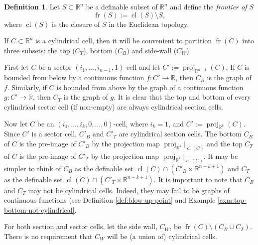 \documentclass[
]{book}
\theoremstyle{definition}
\newtheorem{definition}{Definition}[chapter]
\theoremstyle{definition}
\theoremstyle{definition}
\theoremstyle{definition}
\theoremstyle{remark}
\begin{document}
\begin{definition}
Let \(S \subset \mathbb{R}^n\) be a definable subset of \(\mathbb{R}^n\) and define the \emph{frontier of \(S\)}
\[
{\operatorname{fr} \left( S \right)} := {\operatorname{cl} \left( S \right)} \setminus S,
\]
where \({\operatorname{cl} \left( S \right)}\) is the closure of \(S\) in the Euclidean topology.
\end{definition}

If \(C \subset \mathbb{R}^n\) is a cylindrical cell, then it will be convenient to partition \({\operatorname{fr} \left( C \right)}\) into three subsets: the top (\(C_T\)), bottom (\(C_B\)) and side-wall (\(C_W\)).

First let \(C\) be a sector \((i_1,\ldots,i_{n-1},1)\)-cell and let \(C' := {\operatorname{proj}_{\mathbb{R}^{n-1}}}(C)\). If \(C\) is bounded from below by a continuous function \(f : C' \to \mathbb{R}\), then \(C_B\) is the graph of \(f\). Similarly, if \(C\) is bounded from above by the graph of a continuous function \(g : C' \to \mathbb{R}\), then \(C_T\) is the graph of \(g\). It is clear that the top and bottom of every cylindrical sector cell (if non-empty) are always cylindrical section cells.

Now let \(C\) be an \((i_1,\ldots,i_{k},0,\ldots,0)\)-cell, where \(i_{k}=1\), and \(C' := {\operatorname{proj}_{\mathbb{R}^{k}}}(C)\). Since \(C'\) is a sector cell, \(C'_B\) and \(C'_T\) are cylindrical section cells. The bottom \(C_B\) of \(C\) is the pre-image of \(C'_B\) by the projection map \({\operatorname{proj}_{\mathbb{R}^{k}}}\vert_{{\operatorname{cl} \left( C \right)}}\) and the top \(C_T\) of \(C\) is the pre-image of \(C'_T\) by the projection map \({\operatorname{proj}_{\mathbb{R}^{k}}}\vert_{{\operatorname{cl} \left( C \right)}}\).
It may be simpler to think of \(C_B\) as the definable set \({\operatorname{cl} \left( C \right)} \cap (C'_B \times \mathbb{R}^{n - k + 1})\) and \(C_T\) as the definable set \({\operatorname{cl} \left( C \right)} \cap (C'_T \times \mathbb{R}^{n - k + 1})\).
It is important to note that \(C_B\) and \(C_T\) may not be cylindrical cells. Indeed, they may fail to be graphs of continuous functions (see Definition \ref{def:blow-up-point} and Example \ref{exm:top-bottom-not-cylindrical}.

For both section and sector cells, let the side wall, \(C_W\), be \({\operatorname{fr} \left( C \right)} \setminus (C_B \cup C_T)\).
There is no requirement that \(C_W\) will be (a union of) cylindrical cells.
\end{document}
